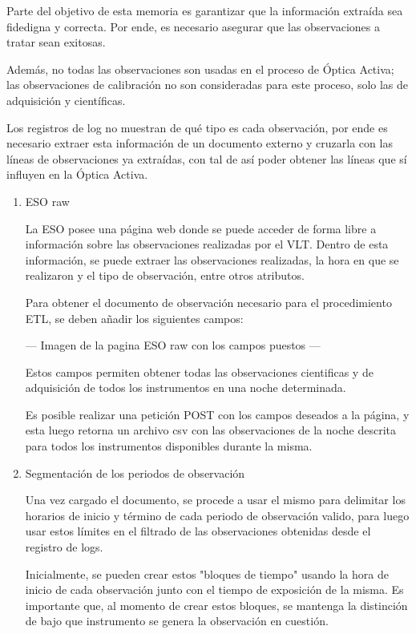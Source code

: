 Parte del objetivo de esta memoria es garantizar que la información extraída sea fidedigna y correcta. Por ende, es necesario asegurar que las observaciones a tratar sean exitosas.

Además, no todas las observaciones son usadas en el proceso de Óptica Activa; las observaciones de calibración no son consideradas para este proceso, solo las de adquisición y científicas.

Los registros de log no muestran de qué tipo es cada observación, por ende es necesario extraer esta información de un documento externo y cruzarla con las líneas de observaciones ya extraídas, con tal de así poder obtener las líneas que sí influyen en la Óptica Activa.

\begin{enumerate}

    \item{ESO raw}
    
    La ESO posee una página web donde se puede acceder de forma libre a información sobre las observaciones realizadas por el VLT. Dentro de esta información, se puede extraer las observaciones realizadas, la hora en que se realizaron y el tipo de observación, entre otros atributos.
    
    Para obtener el documento de observación necesario para el procedimiento ETL, se deben añadir los siguientes campos:
    
    --- Imagen de la pagina ESO raw con los campos puestos ---
    
    Estos campos permiten obtener todas las observaciones cientificas y de adquisición de todos los instrumentos en una noche determinada.
    
    Es posible realizar una petición POST con los campos deseados a la página, y esta luego retorna un archivo csv con las observaciones de la noche descrita para todos los instrumentos disponibles durante la misma.

    \item{Segmentación de los periodos de observación}

    Una vez cargado el documento, se procede a usar el mismo para delimitar los horarios de inicio y término de cada periodo de observación valido, para luego usar estos límites en el filtrado de las observaciones obtenidas desde el registro de logs.

    Inicialmente, se pueden crear estos "bloques de tiempo" usando la hora de inicio de cada observación junto con el tiempo de exposición de la misma. Es importante que, al momento de crear estos bloques, se mantenga la distinción de bajo que instrumento se genera la observación en cuestión.


\end{enumerate}
